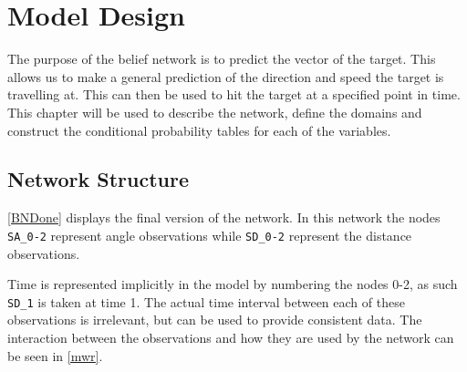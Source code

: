 \chapter{Model Design}\label{BNModel}

The purpose of the belief network is to predict the vector of the
target. This allows us to make a general prediction of the direction and speed
the target is travelling at. This can then be used to hit the target at a
specified point in time. This chapter will be used to describe the network,
define the domains and construct the conditional probability tables for each of
the variables.

\section{Network Structure}
\autoref{BNDone} displays the final version of the network. In this network the
nodes \texttt{SA\_0-2} represent angle observations while \texttt{SD\_0-2}
represent the distance observations.


Time is represented implicitly in the model by numbering the nodes 0-2, as such
\texttt{SD\_1} is taken at time 1. The actual time interval between each of
these observations is irrelevant, but can be used to provide consistent data.
The interaction between the observations and how they are used by the
network can be seen in \autoref{mwr}.


